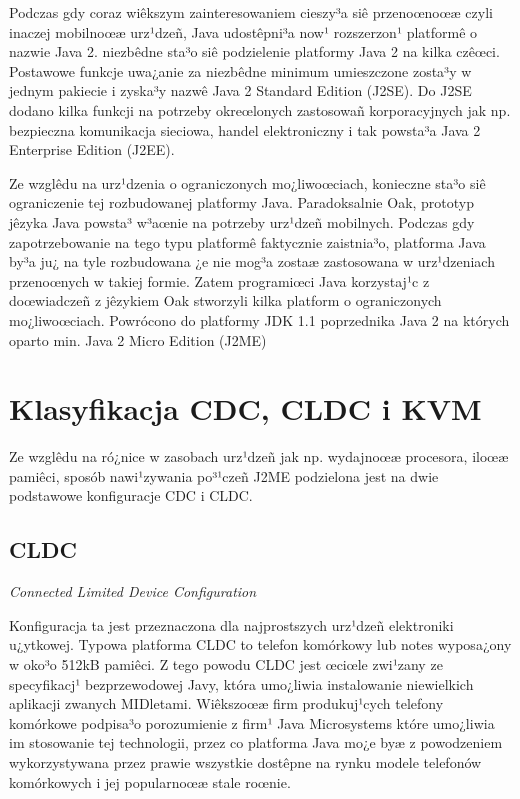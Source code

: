 Podczas gdy coraz wiêkszym zainteresowaniem cieszy³a siê przenoœnoœæ
czyli inaczej mobilnoœæ urz¹dzeñ, Java udostêpni³a now¹ rozszerzon¹
platformê o nazwie Java 2. niezbêdne sta³o siê podzielenie platformy
Java 2 na kilka czêœci. Postawowe funkcje uwa¿anie za niezbêdne
minimum umieszczone zosta³y w jednym pakiecie i zyska³y nazwê Java
2 Standard Edition (J2SE). Do J2SE dodano kilka funkcji na potrzeby
okreœlonych zastosowañ korporacyjnych jak np. bezpieczna komunikacja
sieciowa, handel elektroniczny i tak powsta³a Java 2 Enterprise
Edition (J2EE).

Ze wzglêdu na urz¹dzenia o ograniczonych mo¿liwoœciach, konieczne
sta³o siê ograniczenie tej rozbudowanej platformy Java.
Paradoksalnie Oak, prototyp jêzyka Java powsta³ w³aœnie na potrzeby
urz¹dzeñ mobilnych. Podczas gdy zapotrzebowanie na tego typu
platformê faktycznie zaistnia³o, platforma Java by³a ju¿ na tyle
rozbudowana ¿e nie mog³a zostaæ zastosowana w urz¹dzeniach
przenoœnych w takiej formie. Zatem programiœci Java korzystaj¹c z
doœwiadczeñ z jêzykiem Oak stworzyli kilka platform o ograniczonych
mo¿liwoœciach. Powrócono do platformy JDK 1.1 poprzednika Java 2 na
których oparto min. Java 2 Micro Edition (J2ME)


\section{Klasyfikacja CDC, CLDC i KVM}

Ze wzglêdu na ró¿nice w zasobach urz¹dzeñ jak np. wydajnoœæ
procesora, iloœæ pamiêci, sposób nawi¹zywania po³¹czeñ J2ME
podzielona jest na dwie podstawowe konfiguracje CDC i CLDC.

\subsection{CLDC}
\emph{Connected Limited Device Configuration}

Konfiguracja ta jest przeznaczona dla najprostszych urz¹dzeñ
elektroniki u¿ytkowej. Typowa platforma CLDC to telefon komórkowy
lub notes wyposa¿ony w oko³o 512kB pamiêci. Z tego powodu CLDC jest
œciœle zwi¹zany ze specyfikacj¹ bezprzewodowej Javy, która umo¿liwia
instalowanie niewielkich aplikacji zwanych MIDletami. Wiêkszoœæ firm
produkuj¹cych telefony komórkowe podpisa³o porozumienie z firm¹ Java
Microsystems które umo¿liwia im stosowanie tej technologii, przez co
platforma Java mo¿e byæ z powodzeniem wykorzystywana przez prawie
wszystkie dostêpne na rynku modele telefonów komórkowych i jej
popularnoœæ stale roœnie.
